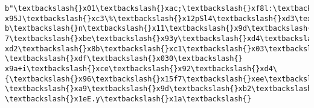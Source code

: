 \documentclass[11pt]{article}
\begin{document}
    \begin{Verbatim}[commandchars=\\\{\}]
b"\textbackslash{}x01\textbackslash{}xac;\textbackslash{}xf8l:\textbackslash{}xb1\textbackslash{}xac/\textbackslash{}xc7\textbackslash{}xc5\textbackslash{}xfd\textbackslash{}xf9\textbackslash{}x82\textbackslash{}xe6\textbackslash{}xc6mB\textbackslash{}xc5\textbackslash{}xde\textbackslash{}xd2L\textasciitilde{}\textbackslash{}x10\_\textbackslash{}x9f\textbackslash{}
x95J\textbackslash{}xc3\%\textbackslash{}x12pSl4\textbackslash{}xd3\textbackslash{}xf5\textbackslash{}x19\}\textbackslash{}x89\textbackslash{}xb8\textbackslash{}xb4\textbackslash{}xb0\textbackslash{}xd3]\%A\textbackslash{}x0f\textbackslash{}xab\textbackslash{}x1e\textbackslash{}xca\textbackslash{}xae\textbackslash{}xb4\textbackslash{}xc
b\textbackslash{}n\textbackslash{}x11\textbackslash{}x9d\textbackslash{}xa0\textbackslash{}xb0\textbackslash{}x1c\textbackslash{}xf8\textbackslash{}x82\textbackslash{}xf3C\textbackslash{}xc0\textbackslash{}x93ah!\textbackslash{}tb!g\textbackslash{}xb4x\textbackslash{}x84\textbackslash{}x87\textbackslash{}x85\textbackslash{}x14s)Sr\textbackslash{}xe
7\textbackslash{}xbe\textbackslash{}x93y\textbackslash{}xd4\textbackslash{}x80\textbackslash{}xc1\textbackslash{}xe1p\textbackslash{}xaa\textbackslash{}x19E\textbackslash{}x9a\textbackslash{}xa7\textbackslash{}x8f\textbackslash{}x86\textbackslash{}xd6\textbackslash{}xee\textbackslash{}xc8<:\textbackslash{}x17=\textbackslash{}xe1\textbackslash{}x83\textbackslash{}
xd2\textbackslash{}x8b\textbackslash{}xc1\textbackslash{}x03\textbackslash{}x05\textbackslash{}x17\textbackslash{}xf3\textbackslash{}xf8\textbackslash{}xa0\textbackslash{}xfa\textbackslash{}xd0\textbackslash{}x00\textbackslash{}xb8\textbackslash{}xb7\textbackslash{}xc4\textbackslash{}x11HL\textbackslash{}xfe-\textbackslash{}xdf\textbackslash{}x030\textbackslash{}
x9a+i\textbackslash{}xce\textbackslash{}x92\textbackslash{}xd4\{\textbackslash{}x96\textbackslash{}x15f7\textbackslash{}xee\textbackslash{}xcc\textbackslash{}xeb\textbackslash{}rS\textbackslash{}x0f\textbackslash{}r\textbackslash{}x1b\textbackslash{}x86\textbackslash{}xdc\textbackslash{}x1bK\textbackslash{}\textbackslash{}\textbackslash{}xac\textbackslash{}x8f\textbackslash{}xe1
\textbackslash{}xa9\textbackslash{}x9d\textbackslash{}xb2\textbackslash{}x88\textbackslash{}xc5A\textbackslash{}x84\textbackslash{}xa2\&\textbackslash{}x7f\textbackslash{}xf7\textbackslash{}xe8S-.\textbackslash{}xb1\textbackslash{}xf1l\textbackslash{}xba\textbackslash{}xcbD\textbackslash{}xa5 \textbackslash{}x1eE.y\textbackslash{}x1a\textbackslash{}

\end{Verbatim}
\end{document}
